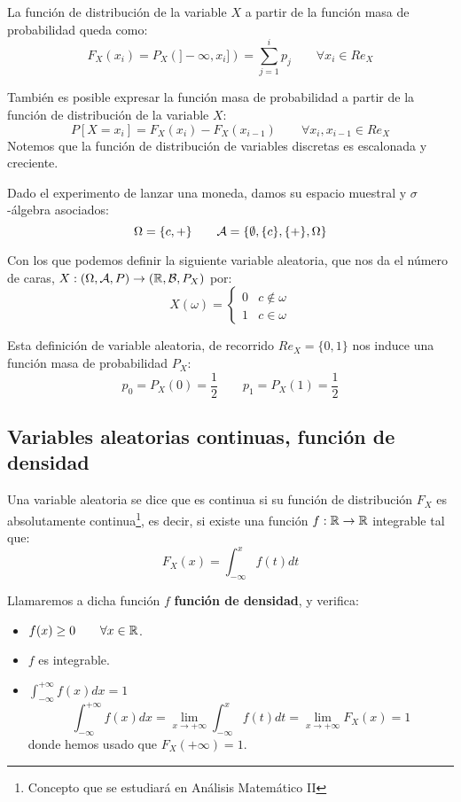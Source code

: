 La función de distribución de la variable $X$ a partir de la función masa de probabilidad queda como:
$$F_X(x_i) = P_X(]-\infty, x_i]) = \sum_{j=1}^i p_j \qquad \forall x_i \in Re_X$$


También es posible expresar la función masa de probabilidad a partir de la función de distribución de la variable $X$:
$$P[X=x_i] = F_X(x_i) - F_X(x_{i-1}) \qquad \forall x_i,x_{i-1}\in Re_X$$
Notemos que la función de distribución de variables discretas es escalonada y creciente.

\begin{ejemplo}
    Dado el experimento de lanzar una moneda, damos su espacio muestral y $\sigma$-álgebra asociados:
    $$\Omega = \{c, +\} \qquad \mathcal{A}=\{\emptyset, \{c\}, \{+\}, \Omega\}$$
    
    Con los que podemos definir la siguiente variable aleatoria, que nos da el número de caras,
    $X:(\Omega, \mathcal{A}, P) \rightarrow (\mathbb R, \mathcal{B}, P_X)$ por:
    $$X(\omega) = \left\{ \begin{array}{cc}
        0 & c \notin \omega \\
        1 & c \in \omega
    \end{array} \right.$$
    
    Esta definición de variable aleatoria, de recorrido $Re_X = \{0,1\}$ nos induce una función masa de probabilidad $P_X$:
    $$p_0 = P_X(0) = \frac{1}{2} \qquad p_1 = P_X(1) = \frac{1}{2}$$
\end{ejemplo}

\subsection{Variables aleatorias continuas, función de densidad}

\begin{definicion}
    Una variable aleatoria se dice que es continua si su función de distribución $F_X$ es absolutamente continua\footnote{Concepto que se estudiará en Análisis Matemático II}, es decir, si existe una función $f:\mathbb R \rightarrow \mathbb R$ integrable tal que:
    $$F_X(x) = \int_{-\infty}^x f(t) dt$$
\end{definicion}

Llamaremos a dicha función $f$ \textbf{función de densidad}, y verifica:
\begin{itemize}
  \item $f(x) \geq 0 \qquad \forall x \in \mathbb R$.
  \item $f$ es integrable.
  \item $\displaystyle \int_{-\infty}^{+\infty}f(x) dx = 1$
  \begin{equation*}
      \int_{-\infty}^{+\infty}f(x) dx = \lim_{x\to +\infty} \int_{-\infty}^x f(t) dt = \lim_{x\to +\infty} F_X(x) = 1
  \end{equation*}
  donde hemos usado que $F_X(+\infty) = 1$.
\end{itemize}

